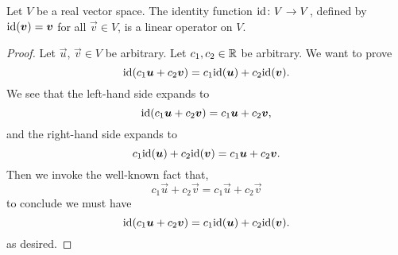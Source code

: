 \begin{example}
Let $V$ be a real vector space. The identity function $\mathrm{id}\colon V\to V$,
defined by $\mathrm{id}(\boldsymbol{v})=\boldsymbol{v}$ for all $\vec{v}\in V$, is a linear
operator on $V$.

\begin{proof}
Let $\vec{u}$, $\vec{v}\in V$ be arbitrary. Let $c_{1},c_{2}\in\mathbb{R}$ be arbitrary.
We want to prove
\begin{equation}
\mathrm{id}(c_{1}\boldsymbol{u} + c_{2}\boldsymbol{v}) = c_{1}\mathrm{id}(\boldsymbol{u}) + c_{2}\mathrm{id}(\boldsymbol{v}).
\end{equation}
We see that the left-hand side expands to
\begin{equation}
\mathrm{id}(c_{1}\boldsymbol{u} + c_{2}\boldsymbol{v}) = c_{1}\boldsymbol{u} + c_{2}\boldsymbol{v},
\end{equation}
and the right-hand side expands to
\begin{equation}
c_{1}\mathrm{id}(\boldsymbol{u}) + c_{2}\mathrm{id}(\boldsymbol{v}) = c_{1}\boldsymbol{u} + c_{2}\boldsymbol{v}.
\end{equation}
Then we invoke the well-known fact that,
\begin{equation}
c_{1}\vec{u} + c_{2}\vec{v} = c_{1}\vec{u} + c_{2}\vec{v}
\end{equation}
to conclude we must have
\begin{equation}
\mathrm{id}(c_{1}\boldsymbol{u} + c_{2}\boldsymbol{v}) = c_{1}\mathrm{id}(\boldsymbol{u}) + c_{2}\mathrm{id}(\boldsymbol{v}).
\end{equation}
as desired.
\end{proof}
\end{example}

